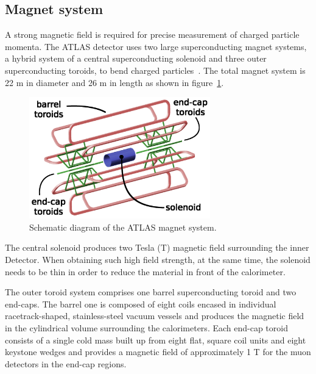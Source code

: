 \subsection{Magnet system}

A strong magnetic field is required for precise measurement of charged particle momenta.
The ATLAS detector uses two large superconducting magnet systems, a hybrid system of a central superconducting solenoid and three outer superconducting toroids, to bend charged particles~\cite{McFayden:phdthesis}.
The total magnet system is 22 m in diameter and 26 m in length as shown in figure~\ref{fig:megnet_sys}.
\begin{figure}[!htb]
  \centering
  \includegraphics[width=0.7\textwidth]{figures/Detector/magnetSystems.png}
  \caption{Schematic diagram of the ATLAS magnet system.}
  \label{fig:megnet_sys}
\end{figure}

The central solenoid produces two Tesla (T) magnetic field surrounding the inner Detector.
When obtaining such high field strength, at the same time, the solenoid needs to be thin in order to reduce the material in front of the calorimeter.

The outer toroid system comprises one barrel superconducting toroid and two end-caps.
The barrel one is composed of eight coils encased in individual racetrack-shaped, stainless-steel vacuum vessels and produces the magnetic field in the cylindrical volume surrounding the calorimeters.
Each end-cap toroid consists of a single cold mass built up from eight flat, square coil units and eight keystone wedges and provides a magnetic field of approximately 1 T for the muon detectors in the end-cap regions.
